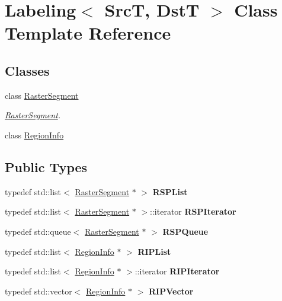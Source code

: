 \hypertarget{class_labeling}{}\section{Labeling$<$ SrcT, DstT $>$ Class Template Reference}
\label{class_labeling}
\subsection*{Classes}
\begin{DoxyCompactItemize}
\item 
class \hyperlink{class_labeling_1_1_raster_segment}{Raster\+Segment}
\begin{DoxyCompactList}\small\item\em \hyperlink{class_labeling_1_1_raster_segment}{Raster\+Segment}. \end{DoxyCompactList}\item 
class \hyperlink{class_labeling_1_1_region_info}{Region\+Info}
\end{DoxyCompactItemize}
\subsection*{Public Types}
\begin{DoxyCompactItemize}
\item 
\hypertarget{class_labeling_aed2219f3d8b3a803d96da6750834fe16}{}\label{class_labeling_aed2219f3d8b3a803d96da6750834fe16} 
typedef std\+::list$<$ \hyperlink{class_labeling_1_1_raster_segment}{Raster\+Segment} $\ast$ $>$ {\bfseries R\+S\+P\+List}
\item 
\hypertarget{class_labeling_a8a57d7361dcb88b2aba008ac3369f8df}{}\label{class_labeling_a8a57d7361dcb88b2aba008ac3369f8df} 
typedef std\+::list$<$ \hyperlink{class_labeling_1_1_raster_segment}{Raster\+Segment} $\ast$ $>$\+::iterator {\bfseries R\+S\+P\+Iterator}
\item 
\hypertarget{class_labeling_ad6742d43c058dda1a526f114a41955d6}{}\label{class_labeling_ad6742d43c058dda1a526f114a41955d6} 
typedef std\+::queue$<$ \hyperlink{class_labeling_1_1_raster_segment}{Raster\+Segment} $\ast$ $>$ {\bfseries R\+S\+P\+Queue}
\item 
\hypertarget{class_labeling_a268813d6a00e26c7b524122bd2d88596}{}\label{class_labeling_a268813d6a00e26c7b524122bd2d88596} 
typedef std\+::list$<$ \hyperlink{class_labeling_1_1_region_info}{Region\+Info} $\ast$ $>$ {\bfseries R\+I\+P\+List}
\item 
\hypertarget{class_labeling_a9264d38d8c52860116e8a751bb0a75eb}{}\label{class_labeling_a9264d38d8c52860116e8a751bb0a75eb} 
typedef std\+::list$<$ \hyperlink{class_labeling_1_1_region_info}{Region\+Info} $\ast$ $>$\+::iterator {\bfseries R\+I\+P\+Iterator}
\item 
\hypertarget{class_labeling_aecf75ed5a0fa2ee88a1b24e09af35f8c}{}\label{class_labeling_aecf75ed5a0fa2ee88a1b24e09af35f8c} 
typedef std\+::vector$<$ \hyperlink{class_labeling_1_1_region_info}{Region\+Info} $\ast$ $>$ {\bfseries R\+I\+P\+Vector}
\end{DoxyCompactItemize}

